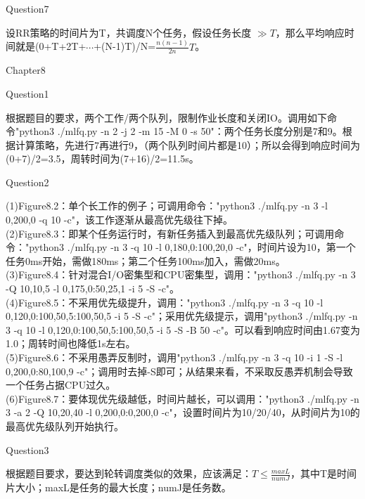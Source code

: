 \documentclass[12pt]{article}
\begin{document}
\begin{large}
	\noindent Question7\\
\end{large}
\hspace*{2em}设RR策略的时间片为T，共调度N个任务，假设任务长度 $\gg T$，那么平均响应时间就是(0+T+2T+$\cdots$+(N-1)T)/N=$\frac{n(n-1)}{2n}T$。\\

\begin{LARGE}
    \noindent Chapter8\\
\end{LARGE}
\begin{large}
	\noindent Question1\\
\end{large}
\hspace*{2em}根据题目的要求，两个工作/两个队列，限制作业长度和关闭IO。调用如下命令"python3 ./mlfq.py -n 2 -j 2 -m 15 -M 0 -s 50"：两个任务长度分别是7和9。根据计算策略，先进行7再进行9，（两个队列时间片都是10）；所以会得到响应时间为(0+7)/2=3.5，周转时间为(7+16)/2=11.5s。\\

\begin{large}
	\noindent Question2\\
\end{large}
\hspace*{2em}(1)Figure8.2：单个长工作的例子；可调用命令："python3 ./mlfq.py -n 3 -l 0,200,0 -q 10 -c"，该工作逐渐从最高优先级往下掉。\\
\hspace*{2em}(2)Figure8.3：即某个任务运行时，有新任务插入到最高优先级队列；可调用命令："python3 ./mlfq.py -n 3 -q 10 -l 0,180,0:100,20,0 -c"，时间片设为10，第一个任务0ms开始，需做180ms；第二个任务100ms加入，需做20ms。\\
\hspace*{2em}(3)Figure8.4：针对混合I/O密集型和CPU密集型，调用："python3 ./mlfq.py -n 3 -Q 10,10,5 -l 0,175,0:50,25,1 -i 5 -S -c"。\\
\hspace*{2em}(4)Figure8.5：不采用优先级提升，调用："python3  ./mlfq.py -n 3 -q 10 -l 0,120,0:100,50,5:100,50,5 -i 5 -S -c"；采用优先级提示，调用"python3 ./mlfq.py -n 3 -q 10 -l 0,120,0:100,50,5:100,50,5 -i 5 -S -B 50 -c"。可以看到响应时间由1.67变为1.0；周转时间也降低1s左右。\\
\hspace*{2em}(5)Figure8.6：不采用愚弄反制时，调用"python3 ./mlfq.py -n 3 -q 10 -i 1 -S -l 0,200,0:80,100,9 -c"；调用时去掉-S即可；从结果来看，不采取反愚弄机制会导致一个任务占据CPU过久。\\
\hspace*{2em}(6)Figure8.7：要体现优先级越低，时间片越长，可以调用："python3 ./mlfq.py -n 3 -a 2 -Q 10,20,40 -l 0,200,0:0,200,0 -c"，设置时间片为10/20/40，从时间片为10的最高优先级队列开始执行。
\newpage
\begin{large}
	\noindent Question3\\
\end{large}
\hspace*{2em}根据题目要求，要达到轮转调度类似的效果，应该满足：$T\leq\frac{maxL}{numJ}$，其中T是时间片大小；maxL是任务的最大长度；numJ是任务数。\\
\end{document}
